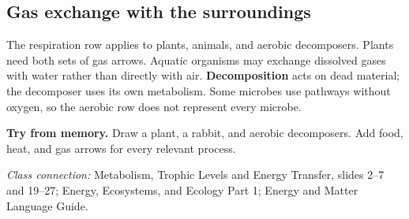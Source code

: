 \documentclass[11pt,letterpaper]{article}
\newcommand{\memorycheck}[1]{\par\smallskip\textbf{Try from memory.} #1\par}
\newcommand{\classsource}[1]{{\footnotesize\textit{Class connection:} #1\par}}
\begin{document}
\subsection*{Gas exchange with the surroundings}
\begin{center}
\par
\end{center}
The respiration row applies to plants, animals, and aerobic decomposers. Plants need both sets of gas arrows. Aquatic organisms may exchange dissolved gases with water rather than directly with air.
\textbf{Decomposition} acts on dead material; the decomposer uses its own metabolism. Some microbes use pathways without oxygen, so the aerobic row does not represent every microbe.
\memorycheck{Draw a plant, a rabbit, and aerobic decomposers. Add food, heat, and gas arrows for every relevant process.}
\classsource{Metabolism, Trophic Levels and Energy Transfer, slides 2--7 and 19--27; Energy, Ecosystems, and Ecology Part 1; Energy and Matter Language Guide.}
\end{document}
